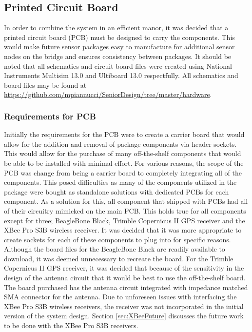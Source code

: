 \subsection{Printed Circuit Board}
\label{sec:PCB}
In order to combine the system in an efficient manor, it was decided that a printed circuit board (PCB) must be designed to carry the components.
This would make future sensor packages easy to manufacture for additional sensor nodes on the bridge and ensures consistency between packages.
It should be noted that all schematics and circuit board files were created using National Instruments Multisim 13.0 and Ultiboard 13.0 respectfully.
All schematics and board files may be found at \url{https://github.com/mpiannucci/SeniorDesign/tree/master/hardware}.
 
\subsubsection{Requirements for PCB}
Initially the requirements for the PCB were to create a carrier board that would allow for the addition and removal of package components via header sockets.
This would allow for the purchase of many off-the-shelf components that would be able to be installed with minimal effort.
For various reasons, the scope of the PCB was change from being a carrier board to completely integrating all of the components.
This posed difficulties as many of the components utilized in the package were bought as standalone solutions with dedicated PCBs for each component.
As a solution for this, all component that shipped with PCBs had all of their circuitry mimicked on the main PCB.
This holds true for all components except for three; BeagleBone Black, Trimble Copernicus II GPS receiver and the XBee Pro S3B wireless receiver.
It was decided that it was more appropriate to create sockets for each of these components to plug into for specific reasons.
Although the board files for the BeagleBone Black are readily available to download, it was deemed unnecessary to recreate the board.
For the Trimble Copernicus II GPS receiver, it was decided that because of the sensitivity in the design of the antenna circuit that it would be best to use the off-the-shelf board.
The board purchased has the antenna circuit integrated with impedance matched SMA connector for the antenna.
Due to unforeseen issues with interfacing the XBee Pro S3B wireless receivers, the receiver was not incorporated in the initial version of the system design.
Section \ref{sec:XBeeFuture} discusses the future work to be done with the XBee Pro S3B receivers.


